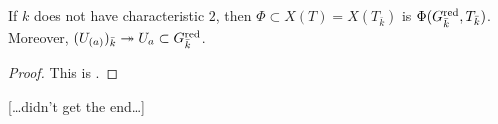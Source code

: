 \begin{theo}
If $k$ does not have characteristic $2$, then $\Phi\subset X(T)=X(T_{\bar k})$ 
is $\Phi(G_{\bar k}^{\mathrm{red}},T_{\bar k})$. Moreover, 
$(U_{(a)})_{\bar k} \twoheadrightarrow U_a\subset G_{\bar k}^{\mathrm{red}}$. 
\end{theo}
\begin{proof}
This is \cite[2.3.10]{cgp10}. 
\end{proof}

[\ldots didn't get the end\ldots]





